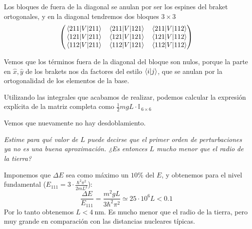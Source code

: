 Los bloques
de fuera de la diagonal se anulan por ser los espines del braket
ortogonales, y en la diagonal tendremos dos bloques $3\times 3$
\begin{equation}
  \begin{pmatrix}
    \mel{211}{V}{211} &  \mel{211}{V}{121} & \mel{211}{V}{112} \\
    \mel{121}{V}{211} &  \mel{121}{V}{121} & \mel{121}{V}{112} \\
    \mel{112}{V}{211} &  \mel{112}{V}{121} & \mel{112}{V}{112} 
  \end{pmatrix}
\end{equation}

Vemos que los términos fuera de la diagonal del bloque son nulos, porque la parte en $\hat{x},\hat{y}$ de los brakets nos da factores del estilo $\braket{i}{j}$, que se anulan por la ortogonalidad de los elementos de la base.

Utilizando las integrales que acabamos de realizar, podemos calcular la
expresión explícita de la matriz completa como $\frac{1}{2}mgL \cdot \mathbb{I}_{\ 6\times 6}$

Vemos que nuevamente no hay desdoblamiento.

\begin{tcolorbox}[halign=left]
  \emph{Estime para qué valor de $L$ puede decirse que el primer orden
  de perturbaciones ya no es una buena aproximación. ¿Es entonces $L$
  mucho menor que el radio de la tierra?}
\end{tcolorbox}

Imponemos que $\Delta E$ sea como máximo un $10\%$ del $E$, y
obtenemos para el nivel fundamental ($E_{111} = 3\cdot\frac{\hbar^2
  \pi^2}{2m L^2}$):
\begin{equation}
  \frac{\Delta E}{E_{111}} = \frac{m^2 g L}{3 \hbar^2 \pi^2} \simeq
  25\cdot10^6 L < 0.1
\end{equation}
Por lo tanto obtenemos $L < \SI{4}{\nm}$. Es mucho menor que el radio
de la tierra, pero muy grande en comparación con las distancias
nucleares típicas.


